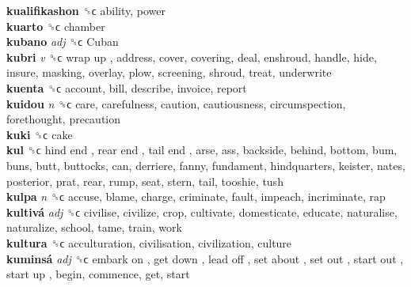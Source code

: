\textbf{kualifikashon} ␝ϲ  ability, power  \\
\textbf{kuarto} ␝ϲ  chamber  \\
\textbf{kubano} \emph{adj}  ␝ϲ   Cuban   \\
\textbf{kubri} \emph{v}  ␝ϲ   wrap up , address, cover, covering, deal, enshroud, handle, hide, insure, masking, overlay, plow, screening, shroud, treat, underwrite  \\
\textbf{kuenta} ␝ϲ  account, bill, describe, invoice, report  \\
\textbf{kuidou} \emph{n}  ␝ϲ  care, carefulness, caution, cautiousness, circumspection, forethought, precaution  \\
\textbf{kuki} ␝ϲ  cake  \\
\textbf{kul} ␝ϲ   hind end ,  rear end ,  tail end , arse, ass, backside, behind, bottom, bum, buns, butt, buttocks, can, derriere, fanny, fundament, hindquarters, keister, nates, posterior, prat, rear, rump, seat, stern, tail, tooshie, tush  \\
\textbf{kulpa} \emph{n}  ␝ϲ  accuse, blame, charge, criminate, fault, impeach, incriminate, rap  \\
\textbf{kultivá} \emph{adj}  ␝ϲ  civilise, civilize, crop, cultivate, domesticate, educate, naturalise, naturalize, school, tame, train, work  \\
\textbf{kultura} ␝ϲ  acculturation, civilisation, civilization, culture  \\
\textbf{kuminsá} \emph{adj}  ␝ϲ   embark on ,  get down ,  lead off ,  set about ,  set out ,  start out ,  start up , begin, commence, get, start  \\
